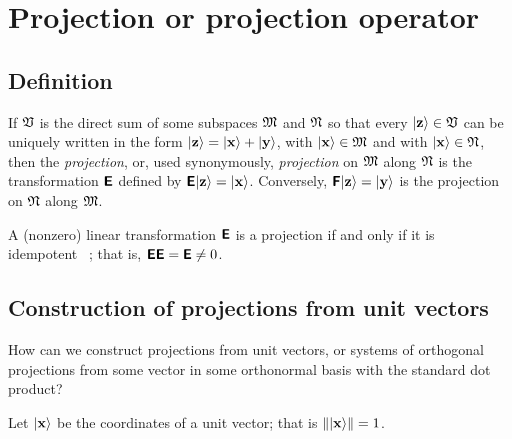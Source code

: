 \section{Projection or projection operator}

\subsection{Definition}
If ${\frak V}$ is the direct sum of some subspaces
${\frak M}$
and
${\frak N}$
so that every $\vert {\bf z} \rangle  \in {\frak V}$ can be uniquely written in the form
$
\vert {\bf z} \rangle
=
\vert {\bf x} \rangle
+
\vert {\bf y} \rangle
$, with
$\vert {\bf x} \rangle  \in {\frak M}$
and with
$\vert {\bf x} \rangle  \in {\frak N}$,
then
the {\em projection}, or, used synonymously,
{\em projection}
on ${\frak M}$
along ${\frak N}$ is the transformation $\textsf{\textbf{E}}$
defined by $\textsf{\textbf{E}}\vert {\bf z} \rangle =\vert {\bf x} \rangle $.
Conversely,
 $\textsf{\textbf{F}}\vert {\bf z} \rangle =\vert {\bf y} \rangle $  is the projection
on ${\frak N}$
along ${\frak M}$.

A (nonzero) linear transformation
$\textsf{\textbf{E}}$ is a projection if and only if
it is idempotent~\cite[\S~41]{halmos-vs} ; that is,
$\textsf{\textbf{E}}\textsf{\textbf{E}}=\textsf{\textbf{E}}\neq 0$.






\subsection{Construction of projections from unit vectors}

How can we construct projections from unit vectors, or systems of orthogonal projections from some vector in some orthonormal basis
with the standard dot product?

Let $\vert {\bf x} \rangle $ be the coordinates of a unit vector;
that is $\| \vert {\bf x} \rangle  \| =1$.

